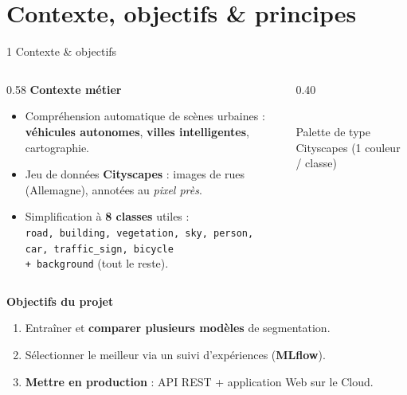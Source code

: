 \documentclass[aspectratio=169,11pt]{beamer}
\newcommand{\emphc}[1]{\textbf{\color{cvblue}#1}}
\newcommand{\code}[1]{\texttt{\small #1}}
\begin{document}
\section{Contexte, objectifs \& principes}
\begin{frame}{1 \textbar{} Contexte \& objectifs}
  \begin{columns}[T]
    \begin{column}{0.58\textwidth}
      \textbf{Contexte métier}
      \begin{itemize}
        \item Compréhension automatique de scènes urbaines :
          \emphc{véhicules autonomes}, \emphc{villes intelligentes}, cartographie.
        \item Jeu de données \emphc{Cityscapes} : images de rues (Allemagne),
          annotées au \emph{pixel près}.
        \item Simplification à \emphc{8 classes} utiles :\\
          \footnotesize \code{road, building, vegetation, sky,
          person, car, traffic\_sign, bicycle}\\
          \code{+ background} (tout le reste).
      \end{itemize}
    \end{column}
    \begin{column}{0.40\textwidth}
      \centering
      \\[0.3em]
      {\footnotesize Palette de type Cityscapes (1 couleur / classe)}
    \end{column}
  \end{columns}
  \vspace{0.5em}
  \textbf{Objectifs du projet}
  \begin{enumerate}
    \item Entraîner et \emphc{comparer plusieurs modèles} de segmentation.
    \item Sélectionner le meilleur via un suivi d'expériences (\emphc{MLflow}).
    \item \emphc{Mettre en production} : API REST + application Web sur le Cloud.
  \end{enumerate}
\end{frame}
\end{document}
